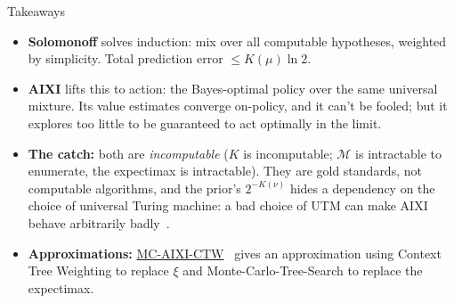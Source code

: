 \documentclass[10pt,aspectratio=169]{beamer}
\newcommand{\cM}{\mathcal{M}}
\newcommand{\aes}{{\text{\ae}}}            %
\begin{document}

\begin{frame}{Takeaways}
\begin{itemize}
    \item \textbf{Solomonoff} solves induction: mix over all computable hypotheses, weighted by simplicity.
    Total prediction error $\leq K(\mu)\ln 2$.
    \pause
    \item \textbf{AIXI} lifts this to action: the Bayes-optimal policy over the same universal mixture.
    Its value estimates converge on-policy, and it can't be fooled; but it explores too little to be guaranteed to act optimally in the limit.
    \pause
    \item \textbf{The catch:} both are \emph{incomputable} ($K$ is incomputable; $\cM$ is intractable to enumerate, the expectimax is intractable).
    They are gold standards, not computable algorithms, and the prior's $2^{-K(\nu)}$ hides a dependency
    on the choice of universal Turing machine: a bad choice of UTM can make AIXI behave arbitrarily badly~.
    \pause
    \item \textbf{Approximations:} \href{https://arxiv.org/abs/0909.0801}{MC-AIXI-CTW}~ gives an approximation using Context Tree Weighting to
    replace $\xi$ and Monte-Carlo-Tree-Search to replace the expectimax.
\end{itemize}
\end{frame}
\end{document}
